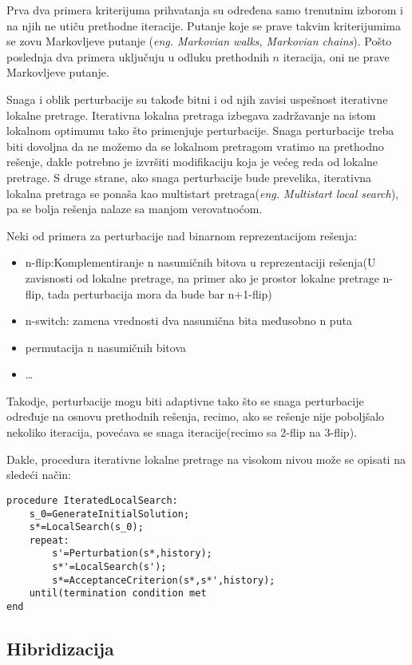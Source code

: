 \documentclass[a4paper]{article}
\begin{document}
Prva dva primera kriterijuma prihvatanja su određena samo trenutnim izborom i na njih ne utiču prethodne iteracije. Putanje koje se prave takvim kriterijumima se zovu Markovljeve putanje (\emph{eng. Markovian walks, Markovian chains}). Pošto poslednja dva primera uključuju u odluku prethodnih $n$ iteracija, oni ne prave Markovljeve putanje. 

Snaga i oblik perturbacije su takođe bitni i od njih zavisi uspešnost iterativne lokalne pretrage. Iterativna lokalna pretraga izbegava zadržavanje na istom lokalnom optimumu tako što primenjuje perturbacije. Snaga perturbacije treba biti dovoljna da ne možemo da se lokalnom pretragom vratimo na prethodno rešenje, dakle potrebno je izvršiti modifikaciju koja je većeg reda od lokalne pretrage. S druge strane, ako snaga perturbacije bude prevelika, iterativna lokalna pretraga se ponaša kao multistart pretraga(\emph{eng. Multistart local search}), pa se bolja rešenja nalaze sa manjom verovatnoćom. 

Neki od primera za perturbacije nad binarnom reprezentacijom rešenja:
\begin{itemize}
\item n-flip:Komplementiranje n nasumičnih bitova u reprezentaciji rešenja(U zavisnosti od lokalne pretrage, na primer
ako je prostor lokalne pretrage n-flip, tada perturbacija mora da bude bar n+1-flip)
\item n-switch: zamena vrednosti dva nasumična bita međusobno n puta
\item permutacija n nasumičnih bitova
\item \ldots
\end{itemize}

Takodje, perturbacije mogu biti adaptivne tako što se snaga perturbacije određuje na osnovu prethodnih rešenja, recimo, ako se rešenje nije poboljšalo nekoliko iteracija, povećava se snaga iteracije(recimo sa 2-flip na 3-flip).

Dakle, procedura iterativne lokalne pretrage na visokom nivou može se opisati na sledeći način:

\begin{lstlisting}
procedure IteratedLocalSearch:
	s_0=GenerateInitialSolution;
	s*=LocalSearch(s_0);
	repeat:
		s'=Perturbation(s*,history);
		s*'=LocalSearch(s');
		s*=AcceptanceCriterion(s*,s*',history);
	until(termination condition met
end
\end{lstlisting}
\subsection{Hibridizacija}
\end{document}
